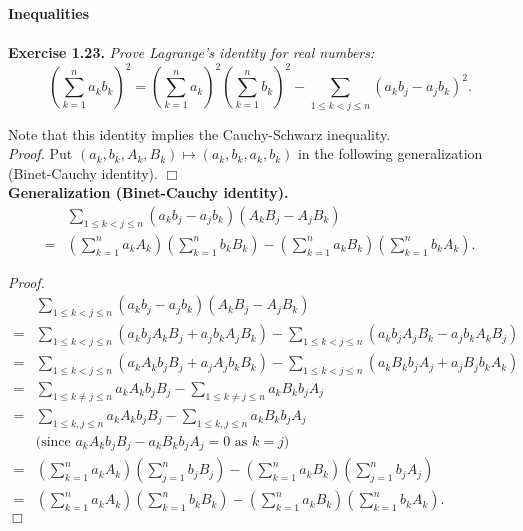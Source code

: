 \documentclass{article}
\begin{document}
\textbf{\large Inequalities} \\\\



\textbf{Exercise 1.23.}
\emph{Prove Lagrange's identity for real numbers:
$$\left( \sum_{k=1}^{n} a_k b_k \right)^2
= \left( \sum_{k=1}^{n} a_k \right)^2 \left( \sum_{k=1}^{n} b_k \right)^2
- \sum_{1 \leq k < j \leq n}
(a_k b_j - a_j b_k)^2.$$}

Note that this identity implies the Cauchy-Schwarz inequality. \\

\emph{Proof.}
Put $(a_k, b_k, A_k, B_k) \mapsto (a_k, b_k, a_k, b_k)$
in the following generalization (Binet-Cauchy identity).
$\Box$ \\

\textbf{Generalization (Binet-Cauchy identity).}
\begin{align*}
&\sum_{1 \leq k < j \leq n}
(a_k b_j - a_j b_k)(A_k B_j - A_j B_k) \\
= &\left( \sum_{k=1}^{n} a_k A_k \right)\left( \sum_{k=1}^{n} b_k B_k \right)
- \left( \sum_{k=1}^{n} a_k B_k \right)\left( \sum_{k=1}^{n} b_k A_k \right).
\end{align*}

\emph{Proof.}
\begin{align*}
&\sum_{1 \leq k < j \leq n}
(a_k b_j - a_j b_k)(A_k B_j - A_j B_k) \\
= &\sum_{1 \leq k < j \leq n}
(a_k b_j A_k B_j + a_j b_k A_j B_k)
- \sum_{1 \leq k < j \leq n}
(a_k b_j A_j B_k - a_j b_k A_k B_j) \\
= &\sum_{1 \leq k < j \leq n}
(a_k A_k b_j B_j + a_j A_j b_k B_k)
- \sum_{1 \leq k < j \leq n}
(a_k B_k b_j A_j + a_j B_j b_k A_k) \\
= &\sum_{1 \leq k \neq j \leq n} a_k A_k b_j B_j
 - \sum_{1 \leq k \neq j \leq n} a_k B_k b_j A_j \\
= &\sum_{1 \leq k, j \leq n} a_k A_k b_j B_j
 - \sum_{1 \leq k, j \leq n} a_k B_k b_j A_j \\
  & \text{(since $a_k A_k b_j B_j - a_k B_k b_j A_j = 0$ as $k = j$)} \\
= &\left( \sum_{k=1}^{n} a_k A_k \right)\left( \sum_{j=1}^{n} b_j B_j \right)
- \left( \sum_{k=1}^{n} a_k B_k \right)\left( \sum_{j=1}^{n} b_j A_j \right) \\
= &\left( \sum_{k=1}^{n} a_k A_k \right)\left( \sum_{k=1}^{n} b_k B_k \right)
- \left( \sum_{k=1}^{n} a_k B_k \right)\left( \sum_{k=1}^{n} b_k A_k \right).
\end{align*}
$\Box$ \\
\end{document}
